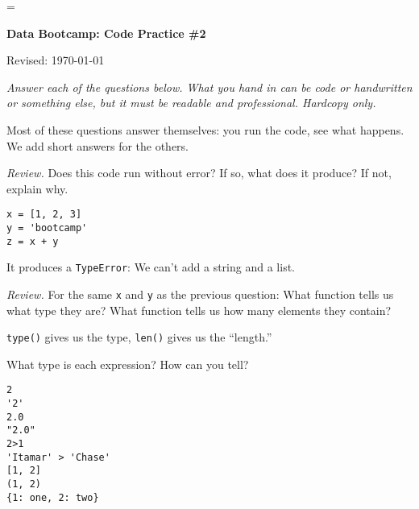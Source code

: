 \documentclass[11pt]{exam}
\begin{document}
\parskip=\bigskipamount
\parindent=0.0in
\thispagestyle{empty}


\bigskip\bigskip
\centerline{\Large \bf Data Bootcamp:  Code Practice \#2}
\centerline{Revised: \today}

\medskip
{\it Answer each of the questions below.  
What you hand in can be code or handwritten or something else,
but it must be readable and professional.
Hardcopy only.}

\begin{solution}
Most of these questions answer themselves:  you run the code,
see what happens.  We add short answers for the others.
\end{solution}

\begin{questions}
\item {\it Review.\/} Does this code run without error? If so, what does it produce?  If not, explain why.
\begin{verbatim}
x = [1, 2, 3]
y = 'bootcamp'
z = x + y
\end{verbatim}

\begin{solution}
It produces a {\tt TypeError}:  We can't add a string and a list.
\end{solution}

\item {\it Review.\/} For the same {\tt x} and {\tt y} as the previous question:
What function tells us what type they are?
What function tells us how many elements they contain?

\begin{solution}
{\tt type()} gives us the type, {\tt len()} gives us the ``length.''
\end{solution}



\item What type is each expression?  How can you tell?
\begin{verbatim}
2
'2'
2.0
"2.0"
2>1
'Itamar' > 'Chase'
[1, 2]
(1, 2)
{1: one, 2: two}
\end{verbatim}


\end{questions}
\end{document}
